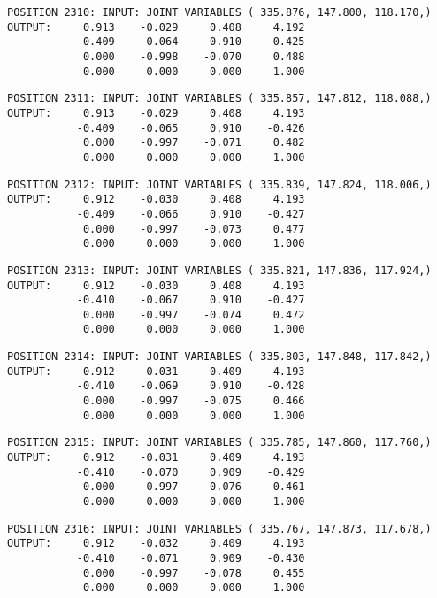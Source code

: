 \begin{verbatim}
POSITION 2310: INPUT: JOINT VARIABLES ( 335.876, 147.800, 118.170,)
OUTPUT:     0.913    -0.029     0.408     4.192
           -0.409    -0.064     0.910    -0.425
            0.000    -0.998    -0.070     0.488
            0.000     0.000     0.000     1.000
\end{verbatim} \pagebreak[1]\begin{verbatim}
POSITION 2311: INPUT: JOINT VARIABLES ( 335.857, 147.812, 118.088,)
OUTPUT:     0.913    -0.029     0.408     4.193
           -0.409    -0.065     0.910    -0.426
            0.000    -0.997    -0.071     0.482
            0.000     0.000     0.000     1.000
\end{verbatim} \pagebreak[1]\begin{verbatim}
POSITION 2312: INPUT: JOINT VARIABLES ( 335.839, 147.824, 118.006,)
OUTPUT:     0.912    -0.030     0.408     4.193
           -0.409    -0.066     0.910    -0.427
            0.000    -0.997    -0.073     0.477
            0.000     0.000     0.000     1.000
\end{verbatim} \pagebreak[1]\begin{verbatim}
POSITION 2313: INPUT: JOINT VARIABLES ( 335.821, 147.836, 117.924,)
OUTPUT:     0.912    -0.030     0.408     4.193
           -0.410    -0.067     0.910    -0.427
            0.000    -0.997    -0.074     0.472
            0.000     0.000     0.000     1.000
\end{verbatim} \pagebreak[1]\begin{verbatim}
POSITION 2314: INPUT: JOINT VARIABLES ( 335.803, 147.848, 117.842,)
OUTPUT:     0.912    -0.031     0.409     4.193
           -0.410    -0.069     0.910    -0.428
            0.000    -0.997    -0.075     0.466
            0.000     0.000     0.000     1.000
\end{verbatim} \pagebreak[1]\begin{verbatim}
POSITION 2315: INPUT: JOINT VARIABLES ( 335.785, 147.860, 117.760,)
OUTPUT:     0.912    -0.031     0.409     4.193
           -0.410    -0.070     0.909    -0.429
            0.000    -0.997    -0.076     0.461
            0.000     0.000     0.000     1.000
\end{verbatim} \pagebreak[1]\begin{verbatim}
POSITION 2316: INPUT: JOINT VARIABLES ( 335.767, 147.873, 117.678,)
OUTPUT:     0.912    -0.032     0.409     4.193
           -0.410    -0.071     0.909    -0.430
            0.000    -0.997    -0.078     0.455
            0.000     0.000     0.000     1.000
\end{verbatim} \pagebreak[1]\begin{verbatim}

\end{verbatim}
